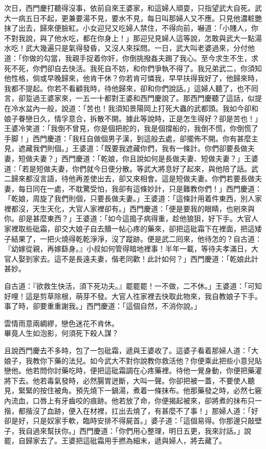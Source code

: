 次日，西門慶打聽得沒事，依前自來王婆家，和這婦人頑耍，只指望武大自死。武大一病五日不起，更兼要湯不見，要水不見，每日叫那婦人又不應。只見他濃粧艷抹了出去，歸來便臉紅。小女迎兒又吃婦人禁住，不得向前，嚇道：「小賤人，你不對我說，與了他水吃，都在你身上！」那迎兒見婦人這等說，怎敢與武大一點湯水吃！武大幾遍只是氣得發昏，又沒人來採問。一日，武大叫老婆過來，分付他道：「你做的勾當，我親手捉着你奸，你倒挑撥姦夫踢了我心。至今求生不生，求死不死，你們卻自去快活。我死自不妨，和你們爭執不得了。我兄弟武二，你須知他性格，倘或早晚歸來，他肯干休？你若肯可憐我，早早扶得我好了，他歸來時，我都不提起。你若不看顧我時，待他歸來，卻和你們說話。」這婦人聽了，也不囘言，卻踅過王婆家來，一五一十都對王婆和西門慶說了。那西門慶聽了這話，似提在冷水盆內一般，說道：「苦也！我須知景陽岡上打死大蟲的武都頭。我如今卻和娘子眷戀日久，情孚意合，拆散不開。據此等說時，正是怎生得好？卻是苦也！」王婆冷笑道：「我倒不曾見，你是個把舵的，我是個撐船的，我倒不慌，你倒慌了手脚！」西門慶道：「我枉自做個男子漢，到這般去處，卻擺佈不開。你有甚麼主見，遮藏我們則個。」王婆道：「既要我遮藏你們，我有一條計。你們卻要長做夫妻，短做夫妻？」{}西門慶道：「乾娘，你且說如何是長做夫妻、短做夫妻？」王婆道：「若是短做夫妻，你們就今日便分散。等武大將息好了起來，與他陪了話。武二歸來都沒言語，待他再差使出去，卻又來相會。這是短做夫妻。你們若要長做夫妻，每日同在一處，不耽驚受怕，我卻有這條妙計，只是難教你們！」西門慶道：「乾娘，周旋了我們則個，只要長做夫妻。」王婆道：「這條計用着件東西，別人家裡都沒，天生天化，大官人家裡卻有。」西門慶道：「便是要我的眼睛，也剜來與你。卻是甚麼東西？」王婆道：「如今這搗子病得重，趁他狼狽，好下手。{}大官人家裡取些砒霜，卻交大娘子自去贖一帖心疼的藥來，卻把這砒霜下在裡面，把這矮子結果了，一把火燒得乾乾淨淨，沒了蹤跡。便是武二囘來，他待怎的？自古道：『幼嫁從親，再嫁繇身。』小叔如何管得暗地裡事！半年一載，等待夫孝滿日，大官人娶到家去。這不是長遠夫妻，偕老同歡！此計如何？」西門慶道：「乾娘此計甚妙。

自古道：『欲救生快活，須下死功夫。』罷罷罷！一不做，二不休。」王婆道：「可知好哩！這是剪草除根，萌芽不發。{}大官人徃家裡去快取此物來，我自教娘子下手。事了時，卻要重重謝我。」西門慶道：「這個自然，不消你說。」

\begin{myquote} 
雲情雨意兩綢繆，戀色迷花不肯休。\\畢竟人生如泡影，何須死下殺人謀？
\end{myquote} 

且說西門慶去不多時，包了一包砒霜，遞與王婆收了。這婆子看着那婦人道：「大娘子，我教你下藥的法兒。如今武大不對你說教你救活他？你便乘此把些小意兒貼戀他。他若問你討藥吃時，便把這砒霜調在心疼藥裡。待他一覺身動，你便把藥灌將下去。他若毒氣發時，必然腸胃迸斷，大叫一聲。你卻把被一蓋，不要使人聽見，緊緊的按住被角。{}預先燒下一鍋湯，煮着一條抹布。他那藥發之時，必然七竅內流血，口唇上有牙齒咬的痕跡。他若放了命，你便揭起被來，卻將煮的抹布只一揩，都揩沒了血跡，便入在材裡，扛出去燒了，有甚麼不了事！」那婦人道：「好卻是好，{}只是奴家手軟，臨時安排不得屍首。」婆子道：「這個易得。你那邊只敲壁子，我自過來幫扶你。」西門慶道：「你們用心整理，明日五更，我來討話。」說罷，自歸家去了。王婆把這砒霜用手撚為細末，遞與婦人，將去藏了。

